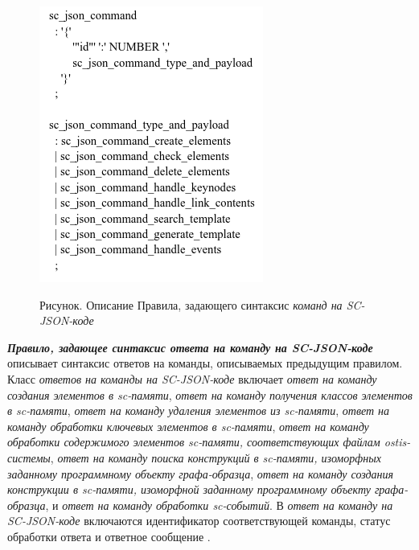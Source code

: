 \begin{figure}[H]
  \center
   \caption{Рисунок. Описание Правила, задающего синтаксис \textit{команд на SC-JSON-коде}}
  \includegraphics[scale=0.9]{author/part6/figures/command.png}
  \label{fig:command}
\end{figure}

\textbf{\textit{Правило, задающее синтаксис \textit{ответа на команду на SC-JSON-коде}} }описывает синтаксис ответов на команды, описываемых предыдущим правилом. Класс \textit{ответов на команды на SC-JSON-коде} включает \textit{ответ на команду создания элементов в sc-памяти}, \textit{ответ на команду получения классов элементов в sc-памяти}, \textit{ответ на команду удаления элементов из sc-памяти}, \textit{ответ на команду обработки ключевых элементов в sc-памяти}, \textit{ответ на команду обработки содержимого элементов sc-памяти, соответствующих файлам ostis-системы}, \textit{ответ на команду поиска конструкций в sc-памяти, изоморфных заданному программному объекту графа-образца}, \textit{ответ на команду создания конструкции в sc-памяти, изоморфной заданному программному объекту графа-образца}, и \textit{ответ на команду обработки sc-событий}. В \textit{ответ на команду на SC-JSON-коде} включаются идентификатор соответствующей команды, статус обработки ответа и ответное сообщение .

